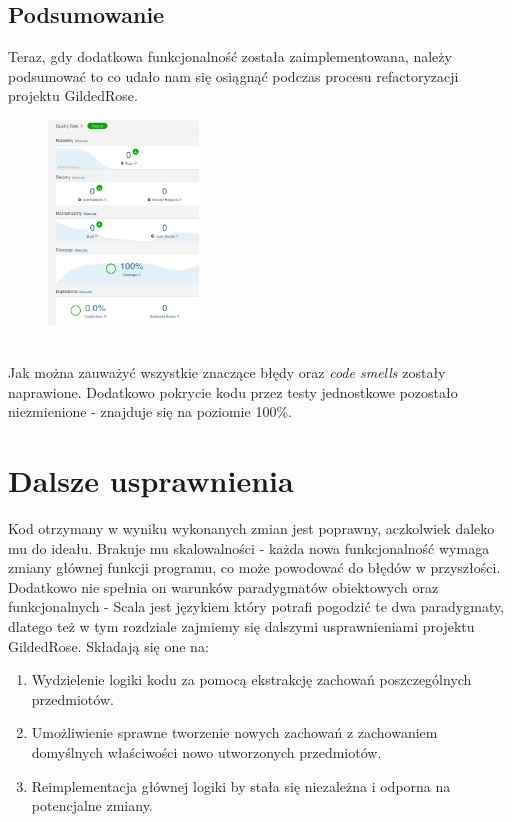 \documentclass[a4paper, 11pt]{article}
\begin{document}
\subsection{Podsumowanie}
Teraz, gdy dodatkowa funkcjonalność została zaimplementowana, należy podsumować to co udało nam się osiągnąć podczas procesu refactoryzacji projektu GildedRose.
\begin{figure}[!tbh]
\includegraphics[width=4cm]{v1_ov}
\centering
\end{figure}\\
Jak można zauważyć wszystkie znaczące błędy oraz \textit{code smells} zostały naprawione. Dodatkowo pokrycie kodu przez testy jednostkowe pozostało niezmienione - znajduje się na poziomie 100\%.
\section{Dalsze usprawnienia}
Kod otrzymany w wyniku wykonanych zmian jest poprawny, aczkolwiek daleko mu do ideału. Brakuje mu skalowalności - każda nowa funkcjonalność wymaga zmiany głównej funkcji programu, co może powodować do błędów w przyszłości. Dodatkowo nie spełnia on warunków paradygmatów obiektowych oraz funkcjonalnych - Scala jest językiem który potrafi pogodzić te dwa paradygmaty, dlatego też w tym rozdziale zajmiemy się dalszymi usprawnieniami projektu GildedRose. Składają się one na:
\begin{enumerate}
 \item Wydzielenie logiki kodu za pomocą ekstrakcję zachowań poszczególnych przedmiotów.
 \item Umożliwienie sprawne tworzenie nowych zachowań z zachowaniem domyślnych właściwości nowo utworzonych przedmiotów.
 \item Reimplementacja głównej logiki by stała się niezależna i odporna na potencjalne zmiany.
\end{enumerate}
\end{document}

